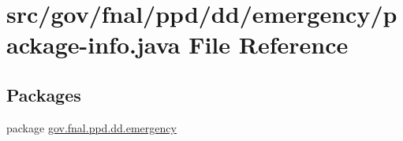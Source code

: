 \hypertarget{gov_2fnal_2ppd_2dd_2emergency_2package-info_8java}{\section{src/gov/fnal/ppd/dd/emergency/package-\/info.java File Reference}
\label{gov_2fnal_2ppd_2dd_2emergency_2package-info_8java}
}
\subsection*{Packages}
\begin{DoxyCompactItemize}
\item 
package \hyperlink{namespacegov_1_1fnal_1_1ppd_1_1dd_1_1emergency}{gov.\-fnal.\-ppd.\-dd.\-emergency}
\end{DoxyCompactItemize}

